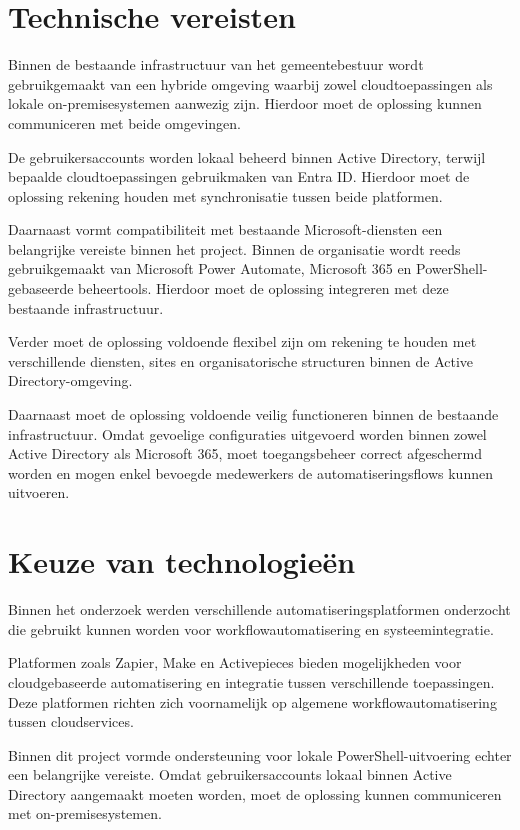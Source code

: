 \section{Technische vereisten}

Binnen de bestaande infrastructuur van het gemeentebestuur wordt gebruikgemaakt van een hybride omgeving waarbij zowel cloudtoepassingen als lokale on-premisesystemen aanwezig zijn. Hierdoor moet de oplossing kunnen communiceren met beide omgevingen.

De gebruikersaccounts worden lokaal beheerd binnen Active Directory, terwijl bepaalde cloudtoepassingen gebruikmaken van Entra ID. Hierdoor moet de oplossing rekening houden met synchronisatie tussen beide platformen.

Daarnaast vormt compatibiliteit met bestaande Microsoft-diensten een belangrijke vereiste binnen het project. Binnen de organisatie wordt reeds gebruikgemaakt van Microsoft Power Automate, Microsoft 365 en PowerShell-gebaseerde beheertools. Hierdoor moet de oplossing integreren met deze bestaande infrastructuur.

Verder moet de oplossing voldoende flexibel zijn om rekening te houden met verschillende diensten, sites en organisatorische structuren binnen de Active Directory-omgeving.

Daarnaast moet de oplossing voldoende veilig functioneren binnen de bestaande infrastructuur. Omdat gevoelige configuraties uitgevoerd worden binnen zowel Active Directory als Microsoft 365, moet toegangsbeheer correct afgeschermd worden en mogen enkel bevoegde medewerkers de automatiseringsflows kunnen uitvoeren.

\section{Keuze van technologieën}

Binnen het onderzoek werden verschillende automatiseringsplatformen on\-der\-zocht die gebruikt kunnen worden voor workflowautomatisering en systeemintegratie.

Platformen zoals Zapier, Make en Activepieces bieden mogelijkheden voor cloudgebaseerde automatisering en integratie tussen verschillende toepassingen. Deze platformen richten zich voornamelijk op algemene workflowautomatisering tussen cloudservices.

Binnen dit project vormde ondersteuning voor lokale PowerShell-uitvoering echter een belangrijke vereiste. Omdat gebruikersaccounts lokaal binnen Active Directory aangemaakt moeten worden, moet de oplossing kunnen communiceren met on-premisesystemen.

